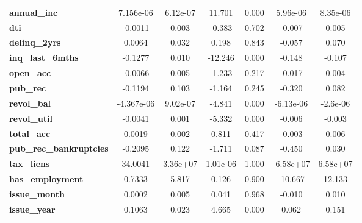 \begin{center}
\begin{tabular}{lcccccc}
\textbf{annual\_inc}                           &    7.156e-06  &     6.12e-07     &    11.701  &         0.000        &     5.96e-06    &     8.35e-06     \\
\textbf{dti}                                   &      -0.0011  &        0.003     &    -0.383  &         0.702        &       -0.007    &        0.005     \\
\textbf{delinq\_2yrs}                          &       0.0064  &        0.032     &     0.198  &         0.843        &       -0.057    &        0.070     \\
\textbf{inq\_last\_6mths}                      &      -0.1277  &        0.010     &   -12.246  &         0.000        &       -0.148    &       -0.107     \\
\textbf{open\_acc}                             &      -0.0066  &        0.005     &    -1.233  &         0.217        &       -0.017    &        0.004     \\
\textbf{pub\_rec}                              &      -0.1194  &        0.103     &    -1.164  &         0.245        &       -0.320    &        0.082     \\
\textbf{revol\_bal}                            &   -4.367e-06  &     9.02e-07     &    -4.841  &         0.000        &    -6.13e-06    &     -2.6e-06     \\
\textbf{revol\_util}                           &      -0.0041  &        0.001     &    -5.332  &         0.000        &       -0.006    &       -0.003     \\
\textbf{total\_acc}                            &       0.0019  &        0.002     &     0.811  &         0.417        &       -0.003    &        0.006     \\
\textbf{pub\_rec\_bankruptcies}                &      -0.2095  &        0.122     &    -1.711  &         0.087        &       -0.450    &        0.030     \\
\textbf{tax\_liens}                            &      34.0041  &     3.36e+07     &  1.01e-06  &         1.000        &    -6.58e+07    &     6.58e+07     \\
\textbf{has\_employment}                       &       0.7333  &        5.817     &     0.126  &         0.900        &      -10.667    &       12.133     \\
\textbf{issue\_month}                          &       0.0002  &        0.005     &     0.041  &         0.968        &       -0.010    &        0.010     \\
\textbf{issue\_year}                           &       0.1063  &        0.023     &     4.665  &         0.000        &        0.062    &        0.151     \\

\end{tabular}
\end{center}
